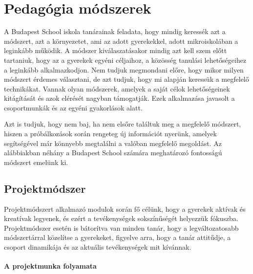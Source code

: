 \section{Pedagógia
  módszerek}
\label{sec:pedagogia_modszerek}

A Budapest School iskola tanárainak feladata, hogy mindig keressék azt a
módszert, azt a környezetet, ami az adott gyerekekkel, adott mikroiskolában a
leginkább működik. A módszer kiválaszatásakor mindig azt kell szem előtt
tartaniuk, hogy az a gyerekek egyéni céljaihoz, a közösség tanulási
lehetőségeihez a leginkább alkalmazkodjon. Nem tudjuk megmondani előre, hogy mikor milyen módszert érdemes választani, de
azt tudjuk, hogy mi alapján keressük a megfelelő technikákat. Vannak olyan módszerek, amelyek a
saját célok lehetőségeinek kitágítását és azok elérését nagyban támogatják.
Ezek alkalmazása javasolt a csoportmunkák és az egyéni gyakorlások alatt.

Azt is tudjuk,
hogy nem baj, ha nem elsőre találtuk meg a megfelelő módszert, hiszen a
próbálkozások során rengeteg új információt nyerünk, amelyek segítségével már
könnyebb megtalálni a valóban megfelelő megoldást. Az alábbiakban néhány a Budapest School számára meghatározó fontosságú módszert
emelünk ki.

\subsection{Projektmódszer}
Projektmódszert alkalmazó modulok során fő célünk, hogy a gyerekek aktívak és
kreatívak legyenek, és ezért a tevékenységek sokszínűségét helyezzük fókuszba.
Projektmódszer esetén is bátorítva van minden tanár, hogy a legváltozatosabb
módszertárral közelítse a gyerekeket, figyelve arra, hogy a tanár attitűdje, a
csoport dinamikája és az aktuális tevékenységek mit kívánnak.

\paragraph{A projektmunka folyamata}


